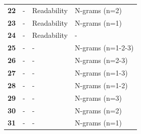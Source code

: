 \documentclass[
10pt, %
a4paper, %
oneside, %
headinclude,footinclude, %
] {book}%
\begin{document}
\begin{table}[]
\begin{tabular}{llll}
\textbf{22} & -              & Readability    & N-grams (n=2)     \\
\textbf{23} & -              & Readability    & N-grams (n=1)     \\
\textbf{24} & -              & Readability    & -                 \\
\textbf{25} & -              & -              & N-grams (n=1-2-3) \\
\textbf{26} & -              & -                & N-grams (n=2-3)   \\
\textbf{27} & -              & -               & N-grams (n=1-3)   \\
\textbf{28} & -              & -               & N-grams (n=1-2)   \\
\textbf{29} & -              & -              & N-grams (n=3)     \\
\textbf{30} & -              & -                & N-grams (n=2)     \\
\textbf{31} & -              & -                & N-grams (n=1)    
\end{tabular}
\label{evaluation-combinations}
\end{table}
\end{document}
